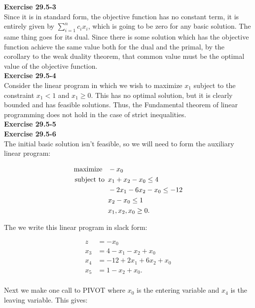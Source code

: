 \documentclass{article}
\begin{document}
\noindent\textbf{Exercise 29.5-3}\\

Since it is in standard form, the objective function has no constant term, it is entirely given by $\sum_{i=1}^n c_i x_i$, which is going to be zero for any basic solution. The same thing goes for its dual. Since there is some solution which has the objective function achieve the same value both for the dual and the primal, by the corollary to the weak duality theorem, that common value must be the optimal value of the objective function.\\

\noindent\textbf{Exercise 29.5-4}\\

Consider the linear program in which we wish to maximize $x_1$ subject to the constraint $x_1 < 1$ and $x_1 \geq 0$.  This has no optimal solution, but it is clearly bounded and has feasible solutions. Thus, the Fundamental theorem of linear programming does not hold in the case of strict inequalities. \\

\noindent\textbf{Exercise 29.5-5}\\

\noindent\textbf{Exercise 29.5-6}\\

The initial basic solution isn't feasible, so we will need to form the auxiliary linear program:

\begin{align*}
\mbox{maximize \,\,\,} & -x_0\\
\mbox{subject to \,} &x_1 + x_2 - x_0 \leq 4 \\
& -2x_1 - 6x_2 - x_0 \leq -12\\
& x_2 - x_0 \leq 1 \\
& x_1,x_2,x_0 \geq 0.
\end{align*}

The we write this linear program in slack form:

\begin{align*}
z &= -x_0\\
x_3 &= 4 - x_1 - x_2 + x_0  \\
x_4 &= -12 + 2x_1 + 6x_2 + x_0 \\
x_5 &= 1 - x_2 + x_0. \\
\end{align*}

Next we make one call to PIVOT where $x_0$ is the entering variable and $x_4$ is the leaving variable. This gives:
\end{document}
